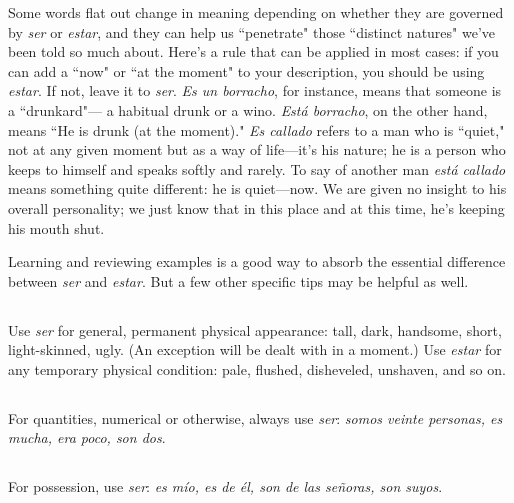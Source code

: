 Some words flat out change in meaning depending on whether
they are governed by \emph{ser} or \emph{estar}, and they can help us ``penetrate"
those ``distinct natures" we've been told so much about. Here's a rule
that can be applied in most cases: if you can add a ``now" or ``at the moment" to your description, you should be using \emph{estar}. If not, leave it to
\emph{ser}. \emph{Es un borracho}, for instance, means that someone is a ``drunkard"---
a habitual drunk or a wino. \emph{Está borracho}, on the other hand, means
``He is drunk (at the moment)." \emph{Es callado} refers to a man who is
``quiet," not at any given moment but as a way of life---it's his nature;
he is a person who keeps to himself and speaks softly and rarely. To say
of another man \emph{está callado} means something quite different: he is
quiet---now. We are given no insight to his overall personality; we just
know that in this place and at this time, he's keeping his mouth shut.

Learning and reviewing examples is a good way to absorb the
essential difference between \emph{ser} and \emph{estar}. But a few other specific tips
may be helpful as well.

\subsection{}

Use \emph{ser} for general, permanent physical appearance: tall,
dark, handsome, short, light-skinned, ugly. (An exception will be dealt
with in a moment.) Use \emph{estar} for any temporary physical condition:
pale, flushed, disheveled, unshaven, and so on.

\subsection{}

For quantities, numerical or otherwise, always use \emph{ser}: \emph{somos veinte personas, es mucha, era poco, son dos}.

\subsection{}

For possession, use \emph{ser}: \emph{es mío, es de él, son de las señoras,
	son suyos}.

\subsection{}

